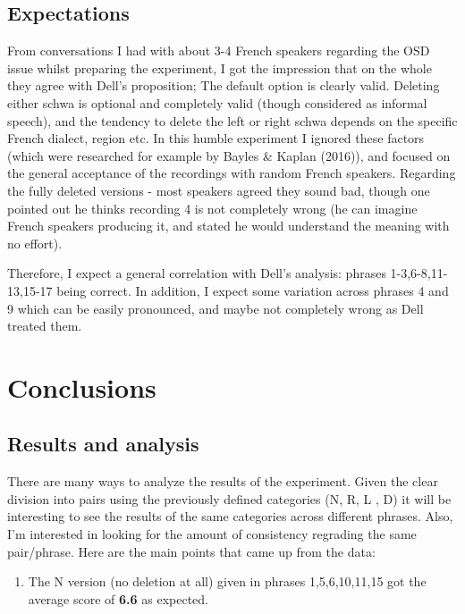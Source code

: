 \documentclass{article}
\begin{document}
\subsection{Expectations}
From conversations I had with about 3-4 French speakers regarding the OSD issue whilst preparing the experiment,  I got the impression that on the whole they agree with Dell's proposition; The default option is clearly valid. Deleting either schwa is optional and completely valid (though considered as informal speech), and the tendency to delete the left or right schwa depends on the specific French dialect, region etc. In this humble experiment I ignored these factors (which were researched for example by Bayles \& Kaplan (2016)), and focused on the general acceptance of the recordings with random French speakers. 
Regarding the fully deleted versions - most speakers agreed they sound bad, though one pointed out he thinks recording 4 is not completely wrong (he can imagine French speakers producing it, and stated he would understand the meaning with no effort). 

Therefore, I expect a general correlation with Dell's analysis: phrases 1-3,6-8,11-13,15-17 being correct. In addition, I expect some variation across phrases 4 and 9 which can be easily pronounced, and maybe not completely wrong as Dell treated them. 

\clearpage
\section{Conclusions}

\subsection{Results and analysis}
There are many ways to analyze the results of the experiment. Given the clear division into pairs using the previously defined categories (N, R, L , D) it will be interesting to see the results of the same categories across different phrases.  Also,  I'm interested in looking for the amount of consistency regrading the same pair/phrase.  Here are the main points that came up from the data:
\begin{enumerate}
  \item The N version (no deletion at all) given in phrases 1,5,6,10,11,15 got the average score of \textbf{6.6} as expected.
\end{enumerate}
\end{document}
